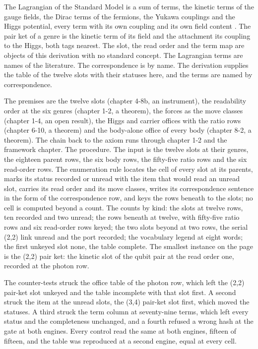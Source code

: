 \begin{chbridge}
The Lagrangian of the Standard Model is a sum of terms, the kinetic terms of the gauge fields, the Dirac terms of the fermions, the Yukawa couplings and the Higgs potential, every term with its own coupling and its own field content \cite{Weinberg1967,Glashow1961}.
The pair ket of a genre is the kinetic term of its field and the attachment its coupling to the Higgs, both tags nearest. The slot, the read order and the term map are objects of this derivation with no standard concept. The Lagrangian terms are names of the literature. The correspondence is by name. The derivation supplies the table of the twelve slots with their statuses here, and the terms are named by correspondence.
\end{chbridge}
\begin{chproof}[instrument]
The premises are the twelve slots (chapter 4-8b, an instrument), the readability order at the six genres (chapter 1-2, a theorem), the forces as the move classes (chapter 1-4, an open result), the Higgs and carrier offices with the ratio rows (chapter 6-10, a theorem) and the body-alone office of every body (chapter 8-2, a theorem). The chain back to the axiom runs through chapter 1-2 and the framework chapter. The procedure. The input is the twelve slots at their genres, the eighteen parent rows, the six body rows, the fifty-five ratio rows and the six read-order rows. The enumeration rule locates the cell of every slot at its parents, marks its status recorded or unread with the item that would read an unread slot, carries its read order and its move classes, writes its correspondence sentence in the form of the correspondence row, and keys the rows beneath to the slots; no cell is computed beyond a count. The counts by kind: the slots at twelve rows, ten recorded and two unread; the rows beneath at twelve, with fifty-five ratio rows and six read-order rows keyed; the two slots beyond at two rows, the serial (2,2) link unread and the port recorded; the vocabulary legend at eight words; the first unkeyed slot none, the table complete. The smallest instance on the page is the (2,2) pair ket: the kinetic slot of the qubit pair at the read order one, recorded at the photon row.

The counter-tests struck the office table of the photon row, which left the (2,2) pair-ket slot unkeyed and the table incomplete with that slot first. A second struck the item at the unread slots, the (3,4) pair-ket slot first, which moved the statuses. A third struck the term column at seventy-nine terms, which left every status and the completeness unchanged, and a fourth refused a wrong hash at the gate at both engines. Every control read the same at both engines, fifteen of fifteen, and the table was reproduced at a second engine, equal at every cell.
\end{chproof}

